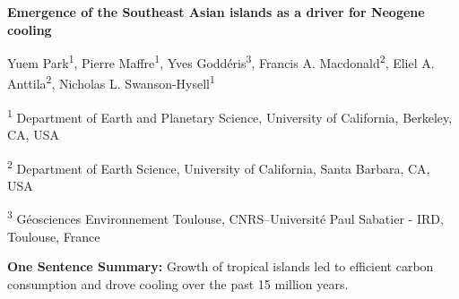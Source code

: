 \documentclass[11pt,letterpaper]{article}
\newcommand{\pCOtwo}{\textit{p}CO$_{2}$\xspace}
\begin{document}
\begin{flushleft}
{\Large \textbf{Emergence of the Southeast Asian islands as a driver for Neogene cooling}}

Yuem Park\textsuperscript{1},
Pierre Maffre\textsuperscript{1},
Yves Godd\'eris\textsuperscript{3},
Francis A. Macdonald\textsuperscript{2},
Eliel A. Anttila\textsuperscript{2},
Nicholas L. Swanson-Hysell\textsuperscript{1}

\bigskip
\textsuperscript{1} Department of Earth and Planetary Science, University of California, Berkeley, CA, USA

\textsuperscript{2} Department of Earth Science, University of California, Santa Barbara, CA, USA

\textsuperscript{3} G\'eosciences Environnement Toulouse, CNRS--Universit\'e Paul Sabatier - IRD, Toulouse, France

\bigskip

\end{flushleft}

\linenumbers

\noindent
\textbf{One Sentence Summary:} Growth of tropical islands led to efficient carbon consumption and drove cooling over the past 15 million years.

\begin{abstract}
The steep topography, tropical climate, and mafic lithologies of the Southeast Asian islands contribute to efficient chemical weathering and carbon sequestration. Concurrent with global cooling since the mid-Miocene, ongoing collision between the Sunda-Banda arc and Australia has increased the area of subaerially-exposed land in the region. Here we integrate lithology into a coupled weathering-climate model to assess how the global climate system responds to changes in paleogeography. We then use paleoshoreline data as boundary conditions to quantify the change in steady-state \pCOtwo associated with the tectonic emergence of the Southeast Asian islands since the mid-Miocene. We find that the modeled decrease in \pCOtwo due to these paleogeographic changes is sufficient to explain long-term climatic cooling over the Neogene.
\end{abstract}
\end{document}
